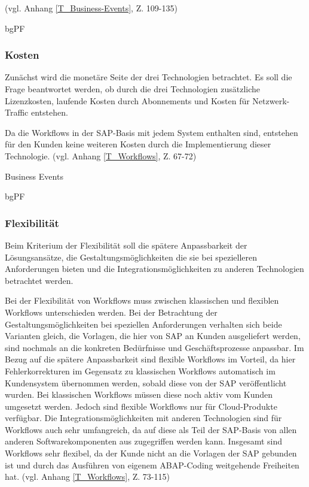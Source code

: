  (vgl. Anhang \ref{T_Business-Events}, Z. 109-135)

bgPF

\subsubsection{Kosten}

Zunächst wird die monetäre Seite der drei Technologien betrachtet. Es soll die Frage beantwortet werden, ob durch die drei Technologien zusätzliche Lizenzkosten, laufende Kosten durch Abonnements und Kosten für Netzwerk-Traffic entstehen. 

Da die Workflows in der SAP-Basis mit jedem System enthalten sind, entstehen für den Kunden keine weiteren Kosten durch die Implementierung dieser Technologie. (vgl. Anhang \ref{T_Workflows}, Z. 67-72)

Business Events

bgPF

\subsubsection{Flexibilität}

Beim Kriterium der Flexibilität soll die spätere Anpassbarkeit der Lösungsansätze, die Gestaltungsmöglichkeiten die sie bei spezielleren Anforderungen bieten und die Integrationsmöglichkeiten zu anderen Technologien betrachtet werden.

Bei der Flexibilität von Workflows muss zwischen klassischen und flexiblen Workflows unterschieden werden. Bei der Betrachtung der  Gestaltungsmöglichkeiten bei speziellen Anforderungen verhalten sich beide Varianten gleich, die Vorlagen, die hier von SAP an Kunden ausgeliefert werden, sind nochmals an die konkreten Bedürfnisse und Geschäftsprozesse anpassbar. Im Bezug auf die spätere Anpassbarkeit sind flexible Workflows im Vorteil, da hier Fehlerkorrekturen im Gegensatz zu klassischen Workflows automatisch im Kundensystem übernommen werden, sobald diese von der SAP veröffentlicht wurden. Bei klassischen Workflows müssen diese noch aktiv vom Kunden umgesetzt werden. Jedoch sind flexible Workflows nur für Cloud-Produkte verfügbar. Die Integrationsmöglichkeiten mit anderen Technologien sind für Workflows auch sehr umfangreich, da auf diese als Teil der SAP-Basis von allen anderen Softwarekomponenten aus zugegriffen werden kann. Insgesamt sind Workflows sehr flexibel, da der Kunde nicht an die Vorlagen der SAP gebunden ist und durch das Ausführen von eigenem ABAP-Coding weitgehende Freiheiten hat. (vgl. Anhang \ref{T_Workflows}, Z. 73-115)

